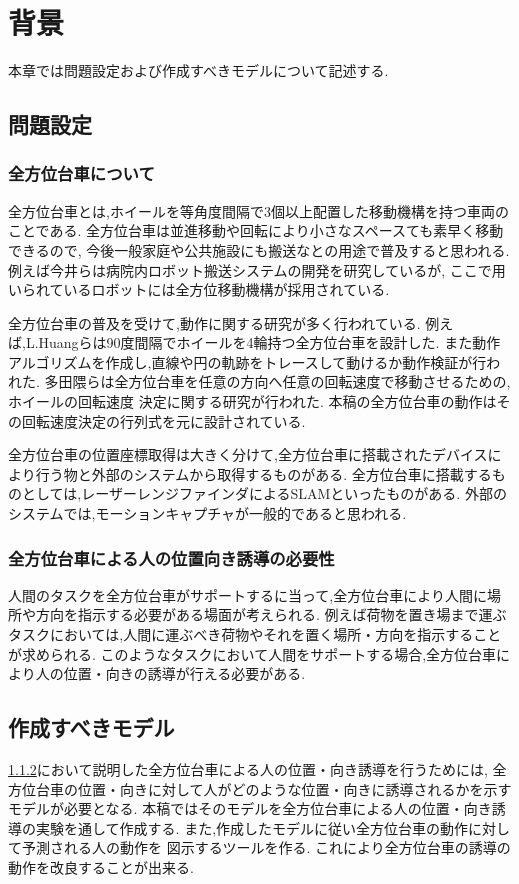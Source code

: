 \chapter{背景}
本章では問題設定および作成すべきモデルについて記述する.

\section{問題設定}

\subsection{全方位台車について}
全方位台車とは,ホイールを等角度間隔で3個以上配置した移動機構を持つ車両のことである.
全方位台車は並進移動や回転により小さなスペースても素早く移動できるので,
今後一般家庭や公共施設にも搬送なとの用途で普及すると思われる.
例えば今井らは病院内ロボット搬送システムの開発を研究しているが,
ここで用いられているロボットには全方位移動機構が採用されている\cite{Imai}.
\par
全方位台車の普及を受けて,動作に関する研究が多く行われている.
例えば,L.Huangらは90度間隔でホイールを4輪持つ全方位台車を設計した.
また動作アルゴリズムを作成し,直線や円の軌跡をトレースして動けるか動作検証が行われた\cite{L}.
多田隈らは全方位台車を任意の方向へ任意の回転速度で移動させるための,ホイールの回転速度
決定に関する研究が行われた\cite{Tada}.
本稿の全方位台車の動作はその回転速度決定の行列式を元に設計されている.
\par
全方位台車の位置座標取得は大きく分けて,全方位台車に搭載されたデバイスにより行う物と外部のシステムから取得するものがある.
全方位台車に搭載するものとしては,レーザーレンジファインダによるSLAMといったものがある.
外部のシステムでは,モーションキャプチャが一般的であると思われる.

\subsection{全方位台車による人の位置向き誘導の必要性}
\label{yuudou}
人間のタスクを全方位台車がサポートするに当って,全方位台車により人間に場所や方向を指示する必要がある場面が考えられる.
例えば荷物を置き場まで運ぶタスクにおいては,人間に運ぶべき荷物やそれを置く場所・方向を指示することが求められる.
このようなタスクにおいて人間をサポートする場合,全方位台車により人の位置・向きの誘導が行える必要がある.

\section{作成すべきモデル}
\ref{yuudou}において説明した全方位台車による人の位置・向き誘導を行うためには,
全方位台車の位置・向きに対して人がどのような位置・向きに誘導されるかを示す
モデルが必要となる.
本稿ではそのモデルを全方位台車による人の位置・向き誘導の実験を通して作成する.
また,作成したモデルに従い全方位台車の動作に対して予測される人の動作を
図示するツールを作る.
これにより全方位台車の誘導の動作を改良することが出来る.